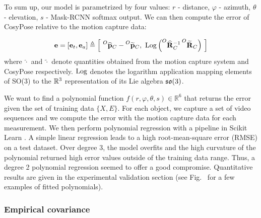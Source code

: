 To sum up, our model is parametrized by four values: $r$ - distance, $\varphi$ - azimuth, $\theta$ - elevation, $s$ - Mask-RCNN softmax output. 
We can then compute the error of CosyPose relative to the motion capture data: 

\begin{equation}
    \mathbf{e}  = [\mathbf{e}_{t}, \mathbf{e}_{a}]  \triangleq  \left[~\prescript{O}{}{\widehat{{\bf p}}}_{C} - \prescript{O}{}{\widetilde{{\bf p}}}_{C}, ~ \operatorname*{Log} \left(\prescript{O}{}{\widehat{{\bf R}}}_{C}^{-1}\prescript{O}{}{\widetilde{{\bf R}}}_{C}\right)~\right]
\end{equation}
%
where $\widehat{\cdot}$ and $\widetilde{\cdot}$ denote quantities obtained from the motion capture system and CosyPose respectively. 
$\operatorname*{Log}$ denotes the logarithm application mapping elements of SO(3) to the $\mathbb{R}^3$ representation of its Lie algebra 
${\mathfrak {so}}(3)$.

We want to find a polynomial function $f(r, \varphi, \theta, s) \in \mathbb{R}^6$ that returns the error given the set of training data $\{X,E\}$. 
For each object, we capture a set of video sequences and we compute the error with the motion capture data for each measurement. 
We then perform polynomial regression with a pipeline in Scikit Learn \cite{scikit-learn}. A simple linear regression leads to a high root-mean-square error (RMSE) 
on a test dataset. Over degree 3, the model overfits and the high curvature of the polynomial returned high error values outside of the training data range. 
Thus, a degree 2 polynomial regression seemed to offer a good compromise.  Quantitative results are given in the experimental validation section 
(see Fig.~ for a few examples of fitted polynomials).







\subsubsection{Empirical covariance}

